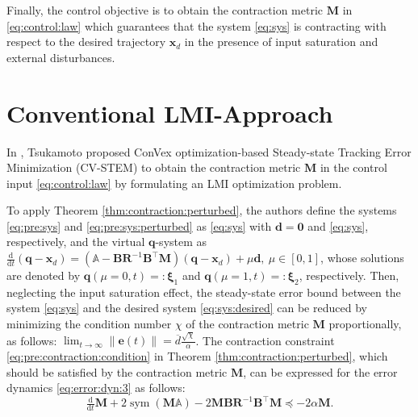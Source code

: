 \documentclass{ifacconf}
\newcommand*{\mv}[1]{\boldsymbol{#1}} %
\newcommand*{\mm}[1]{\boldsymbol{#1}} %
\newcommand*{\norm}[1]{\lVert #1 \rVert} %
\DeclareMathOperator{\mysym}{{sym}}       %
\newcommand\der{\mathrm d}
\newcommand*{\ddtt}{
   \tfrac{\der}{\der t}
}
\begin{document}
Finally, the control objective is to obtain the contraction metric $\mm{M}$ in \eqref{eq:control:law} which guarantees that the system \eqref{eq:sys} is contracting with respect to the desired trajectory $\mv{x}_d$ in the presence of input saturation and external disturbances.

\section{Conventional LMI-Approach} \label{sec:conv:lmi}

In \cite{Tsukamoto:2019aa,Tsukamoto:2021ae}, Tsukamoto {\etal} proposed ConVex optimization-based Steady-state Tracking Error Minimization (CV-STEM) to obtain the contraction metric $\mm{M}$ in the control input \eqref{eq:control:law} by formulating an LMI optimization problem.

To apply Theorem \ref{thm:contraction:perturbed}, the authors define
the systems \eqref{eq:pre:sys} and \eqref{eq:pre:sys:perturbed} as \eqref{eq:sys} with $\mv{d}=\mv{0}$ and 
\eqref{eq:sys}, respectively, and the virtual $\mv{q}$-system as $\ddtt(\mv{q}-\mv{x}_d)=(\mathbb{A}-\mm{B}\mm{R}^{-1}\mv{B}^\top\mm{M})(\mv{q}-\mv{x}_d)+\mu\mv{d},\ \mu\in[0,1]$, whose solutions are denoted by $\mv{q}(\mu=0,t)=:\mv{\xi}_1$ and $\mv{q}(\mu=1,t)=:\mv{\xi}_2$, respectively.
Then, neglecting the input saturation effect, the steady-state error bound between the system \eqref{eq:sys} and the desired system \eqref{eq:sys:desired} can be reduced by minimizing the condition number $\chi$ of the contraction metric $\mm{M}$ proportionally, as follows:
$
   \lim_{t\to\infty}
   \norm{\mv{e}(t)}
   =
   \overline{d}
   \tfrac{\sqrt{\chi}}{\alpha}
$.
The contraction constraint \eqref{eq:pre:contraction:condition} in Theorem \ref{thm:contraction:perturbed}, which should be satisfied by the contraction metric $\mm{M}$, can be expressed for the error dynamics \eqref{eq:error:dyn:3} as follows:
\begin{equation} \label{eq:cstr:ctrc}
   \ddtt\mm{M}
   +
   2\mysym
   \left(
      \mm{M}
      \mathbb{A}
   \right)
   - 
   2
   \mm{M}\mm{B}\mm{R}^{-1}\mm{B}^\top\mm{M}
   \preceq
   -2\alpha \mm{M}
   .
\end{equation}
\end{document}
